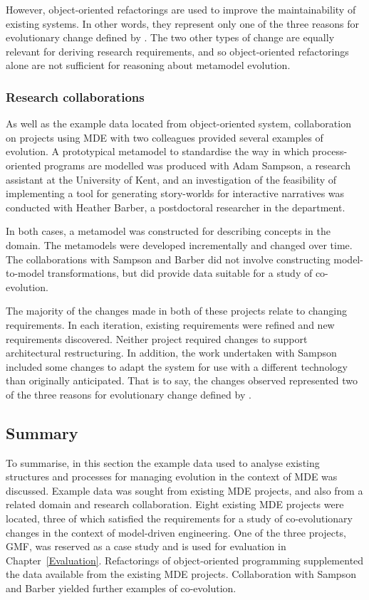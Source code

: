 However, object-oriented refactorings are used to improve the maintainability of existing systems. In other words, they represent only one of the three reasons for evolutionary change defined by \cite{sjoberg93quantifying}. The two other types of change are equally relevant for deriving research requirements, and so object-oriented refactorings alone are not sufficient for reasoning about metamodel evolution.


\subsubsection{Research collaborations}
As well as the example data located from object-oriented system, collaboration on projects using MDE with two colleagues provided several examples of evolution. A prototypical metamodel to standardise the way in which process-oriented programs are modelled was produced with Adam Sampson, a research assistant at the University of Kent, and an investigation of the feasibility of implementing a tool for generating story-worlds for interactive narratives was conducted with Heather Barber, a postdoctoral researcher in the department.

In both cases, a metamodel was constructed for describing concepts in the domain. The metamodels were developed incrementally and changed over time. The collaborations with Sampson and Barber did not involve constructing model-to-model transformations, but did provide data suitable for a study of co-evolution.

The majority of the changes made in both of these projects relate to changing requirements. In each iteration, existing requirements were refined and new requirements discovered. Neither project required changes to support architectural restructuring. In addition, the work undertaken with Sampson included some changes to adapt the system for use with a different technology than originally anticipated. That is to say, the changes observed represented two of the three reasons for evolutionary change defined by \cite{sjoberg93quantifying}. 


\subsection{Summary}
To summarise, in this section the example data used to analyse existing structures and processes for managing evolution in the context of MDE was discussed. Example data was sought from existing MDE projects, and also from a related domain and research collaboration. Eight existing MDE projects were located, three of which satisfied the requirements for a study of co-evolutionary changes in the context of model-driven engineering. One of the three projects, GMF, was reserved as a case study and is used for evaluation in Chapter~\ref{Evaluation}. Refactorings of object-oriented programming supplemented the data available from the existing MDE projects. Collaboration with Sampson and Barber yielded further examples of co-evolution.

